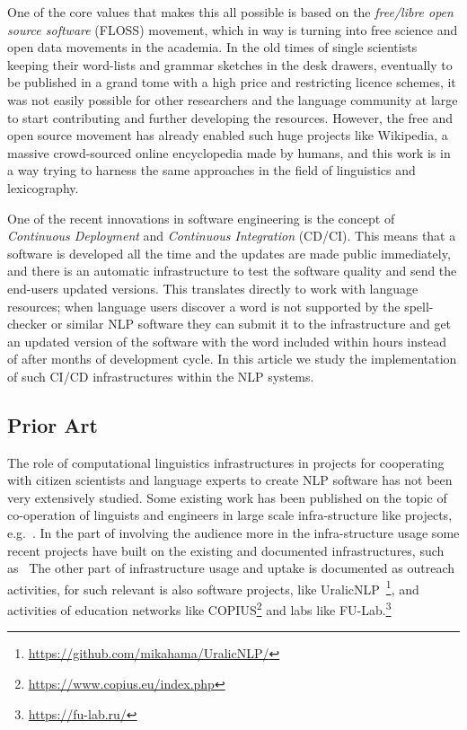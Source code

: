 \documentclass[free]{flammie}
\begin{document}
One of the core values that makes this all possible is based on the \textit{free/libre open source software} (FLOSS)  movement, which in way is turning into free science and open data movements in the academia.
In the old times of single scientists keeping their word-lists and grammar sketches in the desk drawers, eventually  to  be  published  in  a  grand  tome  with  a  high  price  and  restricting licence schemes, it was not easily possible for other researchers and the language community at large to start contributing and further developing the resources.
However, the free and open source movement has already enabled such huge projects like Wikipedia, a massive crowd-sourced online encyclopedia made by humans, and this work is in a way trying to harness the same approaches in the field of linguistics and lexicography.

One of the recent innovations in software engineering is the concept of \textit{Continuous Deployment} and \textit{Continuous Integration} (CD/CI).
This means that a software is developed all the time and the updates are made public immediately, and there is an automatic infrastructure to test the software quality and send the end-users updated versions.
This translates directly to work with language resources; when language users discover a word is not supported by the spell-checker or similar NLP software they can submit it to the infrastructure and get an updated version of the software with the word included within hours instead of after months of development cycle.
In this article we study the implementation of such CI/CD infrastructures within the NLP systems.

\subsection{Prior Art}

The  role of computational linguistics infrastructures in projects for cooperating with citizen scientists and language experts to create NLP software has not been very extensively studied.
Some existing work has been published on the topic of co-operation of linguists and engineers in large scale infra-structure like projects, e.g.~\cite{moshagen2014open,bird2001formal,maxwell2008joint,scannell:2006}.
In the part of involving the audience more in the infra-structure usage some recent projects have built on the existing and documented infrastructures, such as~\cite{alnajjar-etal-2020-verdd,rueter-hamalainen-2017-synchronized}
The other part of infrastructure usage and uptake is documented as outreach activities, for such relevant is also software projects, like UralicNLP~\cite{Hämäläinen2019}\footnote{\url{https://github.com/mikahama/UralicNLP/}}, and activities of education networks like COPIUS\footnote{\url{https://www.copius.eu/index.php}} and labs like FU-Lab.\footnote{\url{https://fu-lab.ru/}}
\end{document}
